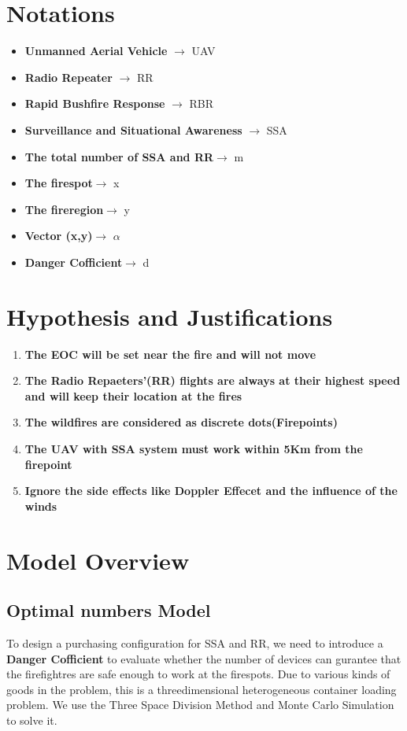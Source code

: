 \documentclass{mcmthesis}
\begin{document}
\section{Notations}
\begin{itemize}
  \item \textbf{Unmanned Aerial Vehicle} $\rightarrow$ UAV
  \item \textbf{Radio Repeater} $\rightarrow$ RR
  \item \textbf{Rapid Bushfire Response} $\rightarrow$ RBR
  \item \textbf{Surveillance and Situational Awareness} $\rightarrow$ SSA
  \item \textbf{The total number of SSA and RR}$\rightarrow$ m
  \item \textbf{The firespot}$\rightarrow$ x
  \item \textbf{The fireregion}$\rightarrow$ y
  \item \textbf{Vector (x,y)}$\rightarrow$ $\alpha$ 
  \item \textbf{Danger Cofficient}$\rightarrow$ d
\end{itemize}
\newpage


\section{Hypothesis and Justifications}
\begin{enumerate}
  \item \textbf{The EOC will be set near the fire and will not move}
  \item \textbf{The Radio Repaeters'(RR) flights are always at their highest speed and will keep their location at the fires}
  \item \textbf{The wildfires are considered as discrete dots(Firepoints)} 
  \item \textbf{The UAV with SSA system must work within 5Km from the firepoint}
  \item \textbf{Ignore the side effects like Doppler Effecet and the influence of the winds}
\end{enumerate}

\section{Model Overview}
\subsection{Optimal numbers Model}
To design a purchasing configuration for SSA and RR, we need to introduce a \textbf{Danger Cofficient}
to evaluate whether the number of devices can gurantee that the firefightres are safe enough to work at
the firespots. Due to various kinds of goods in the problem, this is a threedimensional
heterogeneous container loading problem. We use the Three Space Division
Method and Monte Carlo Simulation to solve it.
\end{document}
